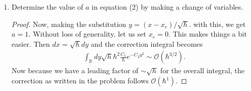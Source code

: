 \documentclass{book}
\theoremstyle{definition}
\newcommand{\R}{\mathbb{R}}
\newcommand{\f}[2]{\frac{#1}{#2}}
\begin{document}
\begin{enumerate}
	
	\item Determine the value of $a$ in equation (2) by making a change of variables.
	\begin{proof}
		Now, making the substitution $y = (x- x_c)/\sqrt{\hbar}$. with this, we get $a=1$. Without loss of generality, let us set $x_c = 0$. This makes things a bit easier. Then $dx = \sqrt{\hbar}dy$ and the correction integral becomes
		\begin{align}
		\int_\R dy \sqrt{h}\hbar^2 \f{C_1}{\hbar} e^{-C_2 y^2} \sim \mathcal{\mathcal{O}(\hbar^{3/2})}.
		\end{align}
		Now because we have a leading factor of $\sim \sqrt{h}$ for the overall integral, the correction as written in the problem follows $\mathcal{O}(\hbar^1)$.
	\end{proof}
\end{enumerate}
\end{document}
